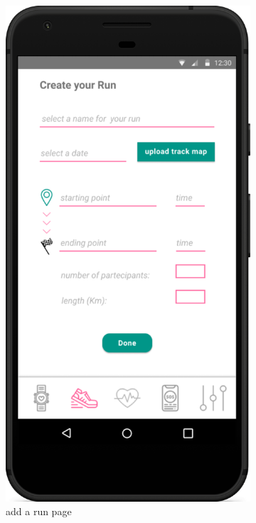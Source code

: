 \documentclass[../main.tex]{subfiles}
\begin{document}
\begin{figure}[H]
	\centering
	\begin{subfigure}[b]{0.45\linewidth}
		\includegraphics[width=\linewidth]{images/mockup/addRun.png}
		\caption{add a run page}
		\label{mock_addRun.png}
	\end{subfigure}
	\caption{}
\end{figure}
\end{document}
